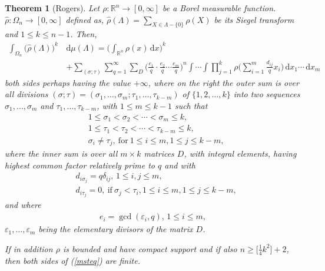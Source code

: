 \documentclass[11pt]{article}
\newtheorem{theorem}{Theorem}[section]
\theoremstyle{definition}
\theoremstyle{proof}
\begin{document}
\begin{theorem}[Rogers]\label{mst}
    Let $ \rho : \mathbb{R}^{n} \to [0, \infty]$ be a Borel measurable function.
    $\widehat{\rho } : {\Omega}_n \to [0, \infty]$ defined as, $\widehat{\rho } (\Lambda ) = \displaystyle\sum_{X \in \Lambda - \{0\}} \rho (X)$ be its Siegel transform and $1 \leq  k \leq n-1$.
    Then,
    \begin{equation}\label{msteq}
        \begin{split}
            \int_{{\Omega}_n} {\big(\widehat{\rho }(\Lambda )\big)}^k \,&  \mathrm{d} \mu (\Lambda ) = \bigg(\int_{\mathbb{R}^{n}} \rho (x) \,  \mathrm{d} x\bigg)^k \\
            & + \sum_{(\sigma ; \tau )} \sum_{q=1}^{\infty}\sum_{D} {\bigg(\frac{e_1}{q} \cdot \frac{e_2}{q} \cdots \frac{e_m}{q} \bigg)}^n \int \cdots \int \prod_{j=1}^{k}\rho \bigg(\sum_{i=1}^{m}\frac{d_{ij}}{q} x_i\bigg) \, \mathrm{d} x_1 \cdots \, \mathrm{d} x_m
        \end{split}
    \end{equation}
    both sides perhaps having the value $+\infty$, where on the right the outer sum is over all divisions $(\sigma ; \tau ) = (\sigma _1, \ldots, \sigma _m; \tau _1, \ldots, \tau _{k-m})$ of $\{1, 2, \ldots , k\}$ into two sequences $\sigma _1, \ldots , \sigma _m$ and $\tau _1, \ldots , \tau _{k-m}$, with $1\leq m \leq k-1$ such that
    \begin{align*}
        & 1 \leq \sigma _1 < \sigma _2 < \cdots < \sigma _m \leq  k, \\
        & 1 \leq  \tau _1 < \tau _2 < \cdots < \tau _{k-m} \leq  k, \\
        & \sigma _i \neq \tau _j, \ \text{for} \ 1 \leq  i \leq  m, 1\leq  j\leq  k-m,
    \end{align*}
    where the inner sum is over all $m \times k$ matrices $D$, with integral elements, having highest common factor relatively prime to $q$ and with
    \begin{equation}\label{mstD}
        \begin{split}
            & d_{i \sigma _j} = q \delta _{ij}, \, 1 \leq  i, j \leq  m,\\
            & d_{i \tau _j} = 0, \ \text{if} \ \sigma _j < \tau _i, 1 \leq  i \leq m , 1\leq  j \leq  k-m,
        \end{split}
    \end{equation}
    and where
    \begin{align*}
        e_i = \gcd (\varepsilon _i, q), \, 1 \leq  i \leq  m,
    \end{align*}
    $\varepsilon _1, \ldots , \varepsilon _m$ being the elementary divisors of the matrix $D$.

    If in addition $\rho$ is bounded and have compact support and if also $n \geq  \big[\frac{1}{4} k ^2\big] + 2$, then both sides of (\ref{msteq}) are finite.
\end{theorem}
\end{document}
